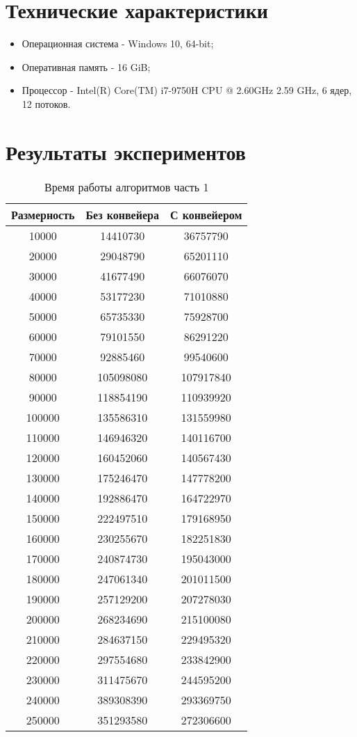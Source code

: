 \section{Технические характеристики}
\begin{itemize}
	\item Операционная система - Windows 10, 64-bit;
	\item Оперативная память - 16 GiB;
	\item Процессор - Intel(R) Core(TM) i7-9750H CPU @ 2.60GHz 2.59 GHz, 6 ядер, 12 потоков.
\end{itemize}

\section{Результаты экспериментов}

\begin{table}[ph!]
  \begin{center}
    \captionsetup{justification=raggedright}
    \caption{Время работы алгоритмов часть 1}
    \label{tab:workcost_classic}
    \begin{tabular}{c|c|c}
      \textbf{Размерность} & \textbf{Без конвейера}  & \textbf{С конвейером} \\
      \hline
		10000 & 14410730 & 36757790\\
		20000 & 29048790 & 65201110\\   
		30000 & 41677490 & 66076070\\   
		40000 & 53177230 & 71010880\\   
		50000 & 65735330 & 75928700\\   
		60000 & 79101550 & 86291220\\   
		70000 & 92885460 & 99540600\\   
		80000 & 105098080 & 107917840\\ 
		90000 & 118854190 & 110939920\\ 
		100000 & 135586310 & 131559980\\
		110000 & 146946320 & 140116700\\
		120000 & 160452060 & 140567430\\
		130000 & 175246470 & 147778200\\
		140000 & 192886470 & 164722970\\
		150000 & 222497510 & 179168950\\
		160000 & 230255670 & 182251830\\
		170000 & 240874730 & 195043000\\
		180000 & 247061340 & 201011500\\
		190000 & 257129200 & 207278030\\
		200000 & 268234690 & 215100080\\
		210000 & 284637150 & 229495320\\
		220000 & 297554680 & 233842900\\
		230000 & 311475670 & 244595200\\
		240000 & 389308390 & 293369750\\
		250000 & 351293580 & 272306600\\
    \end{tabular}
  \end{center}
\end{table}

